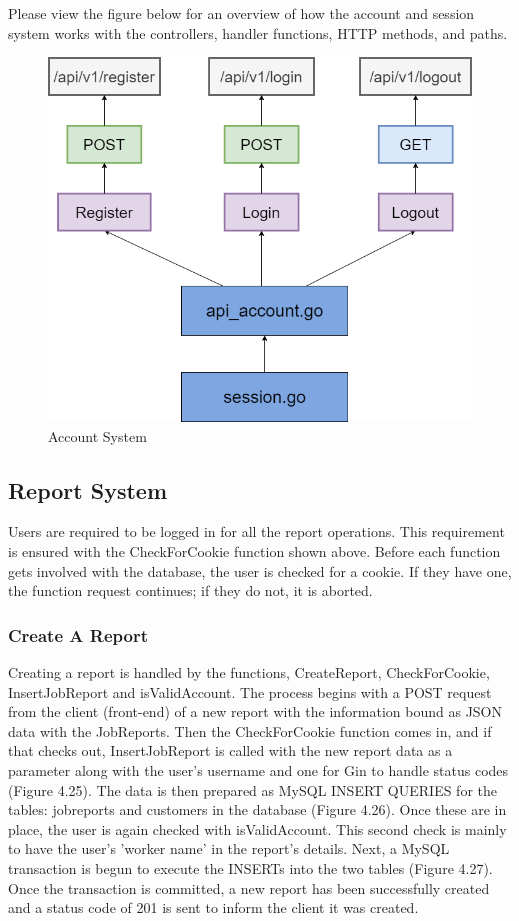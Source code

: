 Please view the figure below for an overview of how the account and session system works with the controllers, handler functions, HTTP methods, and paths.
\begin{figure}[H]
    \caption{Account System}
    \label{image:accountSystem}
    \centering
    \includegraphics[width=1.0\textwidth]{images/horton/account_system/account_system.png}
\end{figure}

\subsection{Report System}
Users are required to be logged in for all the report operations. This requirement is ensured with the CheckForCookie function shown above. Before each function gets involved with the database, the user is checked for a cookie. If they have one, the function request continues; if they do not, it is aborted.

\subsubsection{Create A Report}
Creating a report is handled by the functions, CreateReport, CheckForCookie, InsertJobReport
and isValidAccount. The process begins with a POST request from the client (front-end) of a new report with the information bound as JSON data with the JobReports. Then the CheckForCookie function comes in, and if that checks out, InsertJobReport is called with the new report data as a parameter along with the user's username and one for Gin to handle status codes (Figure 4.25). The data is then prepared as MySQL INSERT QUERIES for the tables: jobreports and customers in the database (Figure 4.26). Once these are in place, the user is again checked with isValidAccount. This second check is mainly to have the user's 'worker name' in the report's details. Next, a MySQL transaction is begun to execute the INSERTs into the two tables (Figure 4.27). Once the transaction is committed, a new report has been successfully created and a status code of 201 is sent to inform the client it was created. 

